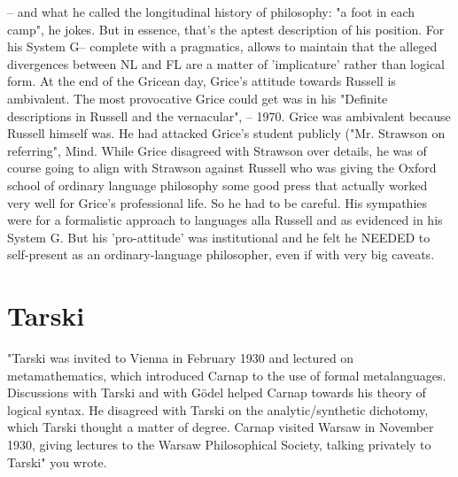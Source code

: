 \documentclass[10pt,titlepage]{book}
\begin{document}
-- and  what he called the longitudinal history of philosophy: "a foot in 
each camp", he  jokes. But in essence, that's the aptest description of his 
position. For his  System G-- complete with a pragmatics, allows to maintain 
that the alleged  divergences between NL and FL are a matter of 
'implicature' rather than logical  form.  At the end of the Gricean  day, Grice's  
attitude towards Russell is ambivalent. The most  provocative Grice could  get 
was in his "Definite descriptions in Russell and the  
vernacular",  -- 1970. Grice was ambivalent because Russell himself was. He 
had attacked  Grice's student publicly ("Mr. Strawson on referring", Mind.  
While Grice  disagreed with Strawson over details, he was of course going 
to  align with  Strawson against Russell who was giving the Oxford school of 
ordinary   language philosophy some good press that actually worked very 
well for  Grice's  professional life. So he had to be careful. His sympathies 
were  for a  formalistic approach to languages alla Russell and as evidenced 
in  his System  G. But his 'pro-attitude' was institutional and he felt he  
NEEDED to  self-present as an ordinary-language philosopher, even if with  
very big  caveats. 

\section{Tarski}

"Tarski was invited to Vienna in February 1930 and lectured on  
metamathematics, which introduced Carnap to the use of formal metalanguages.  
Discussions with Tarski and with Gödel helped Carnap towards his theory of  logical 
syntax. He disagreed with Tarski on the analytic/synthetic dichotomy,  which 
Tarski thought a matter of degree. Carnap visited Warsaw in November 1930,  
giving lectures to the Warsaw Philosophical Society, talking privately to  
Tarski" you wrote.
  
\end{document}
